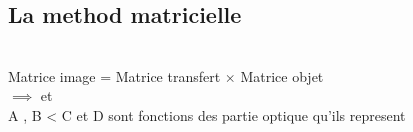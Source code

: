 \documentclass[12pt]{book}
\begin{document}
        \subsection{La method matricielle}
            \begin{center}
                 \\
                Matrice image = Matrice transfert $\times$ Matrice objet \\ 
                $ \implies$ et  \\
                A , B < C et D sont fonctions des partie optique qu'ils represent

            \end{center}
\end{document}

